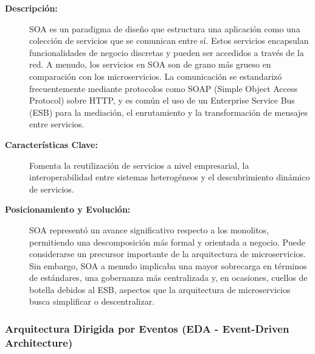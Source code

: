 \begin{description}
    \item[\textbf{Descripción:}] SOA es un paradigma de diseño que estructura una aplicación como una colección de servicios que se comunican entre sí. Estos servicios encapsulan funcionalidades de negocio discretas y pueden ser accedidos a través de la red. A menudo, los servicios en SOA son de grano más grueso en comparación con los microservicios. La comunicación se estandarizó frecuentemente mediante protocolos como SOAP (Simple Object Access Protocol) sobre HTTP, y es común el uso de un Enterprise Service Bus (ESB) para la mediación, el enrutamiento y la transformación de mensajes entre servicios.
    \item[\textbf{Características Clave:}] Fomenta la reutilización de servicios a nivel empresarial, la interoperabilidad entre sistemas heterogéneos y el descubrimiento dinámico de servicios.
    \item[\textbf{Posicionamiento y Evolución:}] SOA representó un avance significativo respecto a los monolitos, permitiendo una descomposición más formal y orientada a negocio. Puede considerarse un precursor importante de la arquitectura de microservicios. Sin embargo, SOA a menudo implicaba una mayor sobrecarga en términos de estándares, una gobernanza más centralizada y, en ocasiones, cuellos de botella debidos al ESB, aspectos que la arquitectura de microservicios busca simplificar o descentralizar.
\end{description}

\subsubsection*{Arquitectura Dirigida por Eventos (EDA - Event-Driven Architecture) \cite{aws_eda}}


